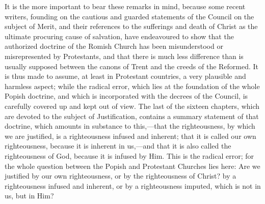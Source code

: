 \documentclass[
]{book}
\begin{document}
It is the more important to bear these remarks in mind, because some recent writers, founding on the cautious and guarded statements of the Council on the subject of Merit, and their references to the sufferings and death of Christ as the ultimate procuring cause of salvation, have endeavoured to show that the authorized doctrine of the Romish Church has been misunderstood or misrepresented by Protestants, and that there is much less difference than is usually supposed between the canons of Trent and the creeds of the Reformed. It is thus made to assume, at least in Protestant countries, a very plausible and harmless aspect; while the radical error, which lies at the foundation of the whole Popish doctrine, and which is incorporated with the decrees of the Council, is carefully covered up and kept out of view. The last of the sixteen chapters, which are devoted to the subject of Justification, contains a summary statement of that doctrine, which amounts in substance to this,---that the righteousness, by which we are justified, is a righteousness infused and inherent; that it is called our own righteousness, because it is inherent in us,---and that it is also called the righteousness of God, because it is infused by Him. This is the radical error; for the whole question between the Popish and Protestant Churches lies here: Are we justified by our own righteousness, or by the righteousness of Christ? by a righteousness infused and inherent, or by a righteousness imputed, which is not in us, but in Him?
\end{document}
